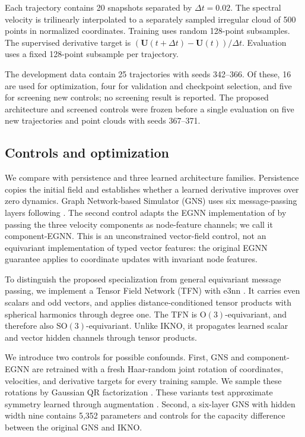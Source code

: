 \documentclass[mlmain]{jmlr}
\newcommand{\SO}{\mathrm{SO}(3)}
\newcommand{\IKNO}{\textsc{IKNO}}
\begin{document}
Each trajectory contains 20 snapshots separated by $\Delta t=0.02$. The
spectral velocity is trilinearly interpolated to a separately sampled irregular
cloud of 500 points in normalized coordinates. Training uses random 128-point
subsamples. The supervised derivative target is
$(\boldsymbol{U}(t+\Delta t)-\boldsymbol{U}(t))/\Delta t$. Evaluation uses a
fixed 128-point subsample per trajectory.

The development data contain 25 trajectories with seeds 342--366. Of these, 16
are used for optimization, four for validation and checkpoint selection, and
five for screening new controls; no screening result is reported. The proposed
architecture and screened controls were frozen before a single evaluation on
five new trajectories and point clouds with seeds 367--371.

\subsection{Controls and optimization}

We compare with persistence and three learned architecture families.
Persistence copies
the initial field and establishes whether a learned derivative improves over
zero dynamics. Graph Network-based Simulator (GNS) uses six message-passing
layers following \citet{sanchez2020simulate}. The second control adapts the
EGNN implementation of \citet{satorras2021en} by passing the three velocity
components as node-feature channels; we call it component-EGNN. This is
an unconstrained vector-field control, not an equivariant implementation of
typed vector features: the original EGNN guarantee applies to coordinate
updates with invariant node features.

To distinguish the proposed specialization from general equivariant message
passing, we implement a Tensor Field Network (TFN)
\citep{thomas2018tensor} with e3nn \citep{geiger2022e3nn}. It carries even
scalars and odd vectors, and applies distance-conditioned tensor products with
spherical harmonics through degree one. The TFN is $\mathrm{O}(3)$-equivariant,
and therefore also $\SO$-equivariant. Unlike \IKNO{}, it propagates learned
scalar and vector hidden channels through tensor products.

We introduce two controls for possible confounds. First, GNS and
component-EGNN are retrained with a fresh Haar-random joint rotation of
coordinates, velocities, and derivative targets for every training sample. We
sample these rotations by Gaussian QR factorization
\citep{mezzadri2007random}. These variants test approximate symmetry learned
through augmentation \citep{brandstetter2022lie,puny2022frame}. Second,
a six-layer GNS with hidden width nine contains 5,352 parameters and controls
for the capacity difference between the original GNS and \IKNO{}.
\end{document}
